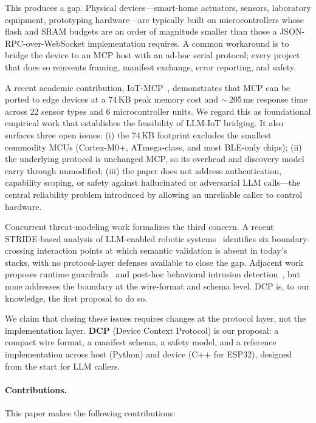 \documentclass[11pt,a4paper]{article}
\begin{document}
This produces a gap. Physical devices---smart-home actuators, sensors,
laboratory equipment, prototyping hardware---are typically built on
microcontrollers whose flash and SRAM budgets are an order of magnitude
smaller than those a JSON-RPC-over-WebSocket implementation requires. A
common workaround is to bridge the device to an MCP host with an ad-hoc
serial protocol; every project that does so reinvents framing, manifest
exchange, error reporting, and safety.

A recent academic contribution, IoT-MCP~\cite{iotmcp2025}, demonstrates that
MCP can be ported to edge devices at a 74\,KB peak memory cost and
$\sim$\,205\,ms response time across 22 sensor types and 6 microcontroller
units. We regard this as foundational empirical work that establishes the
feasibility of LLM-IoT bridging. It also surfaces three open issues: (i) the
74\,KB footprint excludes the smallest commodity MCUs (Cortex-M0+, ATmega-class,
and most BLE-only chips); (ii) the underlying protocol is unchanged MCP, so
its overhead and discovery model carry through unmodified; (iii) the paper
does not address authentication, capability scoping, or safety against
hallucinated or adversarial LLM calls---the central reliability problem
introduced by allowing an unreliable caller to control hardware.

Concurrent threat-modeling work formalizes the third concern. A recent
STRIDE-based analysis of LLM-enabled robotic systems~\cite{prompt_to_actuation}
identifies six boundary-crossing interaction points at which semantic
validation is absent in today's stacks, with no protocol-layer defenses
available to close the gap. Adjacent work proposes runtime
guardrails~\cite{web_of_drones,robosafe} and post-hoc behavioral intrusion
detection~\cite{aegismcp}, but none addresses the boundary at the
wire-format and schema level. DCP is, to our knowledge, the first proposal
to do so.

We claim that closing these issues requires changes at the protocol layer,
not the implementation layer. \textbf{DCP} (Device Context Protocol) is
our proposal: a compact wire format, a manifest schema, a safety model, and
a reference implementation across host (Python) and device (C++ for ESP32),
designed from the start for LLM callers.

\paragraph{Contributions.} This paper makes the following contributions:
\end{document}
